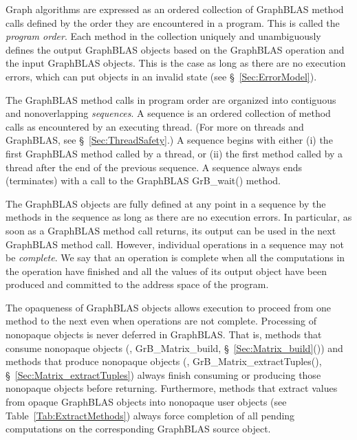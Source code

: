 Graph algorithms are expressed as an ordered collection of GraphBLAS
method calls defined by the order they are encountered in a program.
This is called the \emph{program order}.  Each method in the collection
uniquely and unambiguously defines the output GraphBLAS objects based
on the GraphBLAS operation and the input GraphBLAS objects. This is the case as long
as there are no execution errors, which can put objects in an
invalid state (see \S~\ref{Sec:ErrorModel}).

The GraphBLAS method calls in program order are organized into 
contiguous and nonoverlapping \emph{sequences}.  A sequence is an
ordered collection of method calls as encountered by an executing thread. (For more
on threads and GraphBLAS, see \S~\ref{Sec:ThreadSafety}.)  A sequence
begins with either (i) the first GraphBLAS method called by a thread, or
(ii) the first method called by a thread after the end of the previous
sequence. A sequence always ends (terminates) with a call to the GraphBLAS
{\sf GrB\_wait()} method.

The GraphBLAS objects are fully defined at any point in a sequence by the
methods in the sequence as long as there are no execution errors.
In particular, as soon as a GraphBLAS
method call returns, its output can be used in the next GraphBLAS
method call.  However, individual operations in a sequence may not
be \emph{complete}. We say that an operation is complete when all the
computations in the operation have finished and all the values of its
output object have been produced and committed to the address 
space of the program.

The opaqueness of GraphBLAS objects allows execution to proceed
from one method to the next even when operations are not complete.
Processing of nonopaque objects is never deferred in GraphBLAS. That is,
methods that consume nonopaque objects (\eg, {\sf GrB\_Matrix\_build},
\S~\ref{Sec:Matrix_build}()) and methods that produce nonopaque objects (\eg,
{\sf GrB\_Matrix\_extractTuples()}, \S~\ref{Sec:Matrix_extractTuples})
always finish consuming or producing those nonopaque objects before
returning.   Furthermore, methods that extract values from opaque GraphBLAS objects
into nonopaque user objects (see Table~\ref{Tab:ExtractMethods})
always force completion of all pending computations on the 
corresponding GraphBLAS source object.

